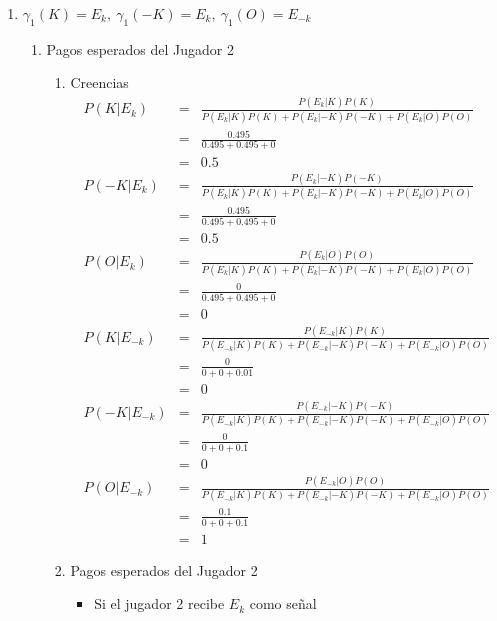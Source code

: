 {\begin{enumerate}
    \item $\gamma_1(K)=E_k, \ \gamma_1(-K)=E_k, \ \gamma_1(O)=E_{-k}$ %
    \begin{enumerate}
    \item Pagos esperados del Jugador 2
    \begin{enumerate}
        \item Creencias
            \begin{eqnarray*}
                P(K|E_k)&=&\frac{P(E_k|K)P(K)}{P(E_k|K)P(K)+P(E_k|-K)P(-K)+P(E_k|O)P(O)}\\
                        &=&\frac{0.495}{0.495+0.495+0}\\
                        &=&0.5\\
                P(-K|E_k)&=&\frac{P(E_k|-K)P(-K)}{P(E_k|K)P(K)+P(E_k|-K)P(-K)+P(E_k|O)P(O)}\\
                        &=&\frac{0.495}{0.495+0.495+0}\\
                        &=&0.5\\
                P(O|E_k)&=&\frac{P(E_k|O)P(O)}{P(E_k|K)P(K)+P(E_k|-K)P(-K)+P(E_k|O)P(O)}\\
                        &=&\frac{0}{0.495+0.495+0}\\
                        &=&0\\
                P(K|E_{-k})&=&\frac{P(E_{-k}|K)P(K)}{P(E_{-k}|K)P(K)+P(E_{-k}|-K)P(-K)+P(E_{-k}|O)P(O)}\\
                        &=&\frac{0}{0+0+0.01}\\
                        &=&0\\
                P(-K|E_{-k})&=&\frac{P(E_{-k}|-K)P(-K)}{P(E_{-k}|K)P(K)+P(E_{-k}|-K)P(-K)+P(E_{-k}|O)P(O)}\\
                        &=&\frac{0}{0+0+0.1}\\
                        &=&0\\
                P(O|E_{-k})&=&\frac{P(E_{-k}|O)P(O)}{P(E_{-k}|K)P(K)+P(E_{-k}|-K)P(-K)+P(E_{-k}|O)P(O)}\\
                        &=&\frac{0.1}{0+0+0.1}\\
                        &=&1
            \end{eqnarray*}
        \item Pagos esperados del Jugador 2
        \begin{itemize}
        \item Si el jugador 2 recibe $E_k$ como señal
            \begin{eqnarray*}

\end{eqnarray*}
\end{itemize}
\end{enumerate}
\end{enumerate}
\end{enumerate}}
